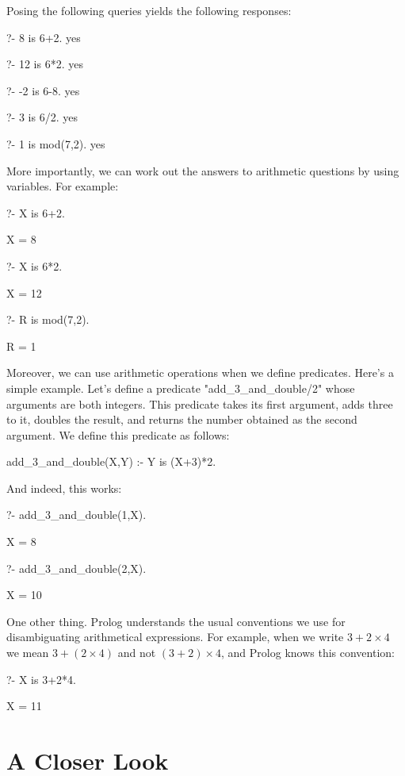 Posing the following queries yields the following responses:

\begin{LPNcodedisplay}
?- 8 is 6+2.
yes

?- 12 is 6*2.
yes

?- -2 is 6-8.
yes

?- 3 is 6/2.
yes

?- 1 is mod(7,2).
yes
\end{LPNcodedisplay}


More importantly, we can work out the answers to arithmetic questions
by using variables.  For example:

\begin{LPNcodedisplay}
?- X is 6+2.

X = 8

?- X is 6*2.

X = 12

?- R is mod(7,2).

R = 1
\end{LPNcodedisplay}

Moreover, we can use arithmetic operations when we define predicates.
Here's a simple example.  Let's define a predicate
"add_3_and_double/2" whose arguments are both integers.  This
predicate takes its first argument, adds three to it, doubles the
result, and returns the number obtained as the second argument.  We
define this predicate as follows:
\begin{LPNcodedisplay}
add_3_and_double(X,Y) :- Y is (X+3)*2.
\end{LPNcodedisplay}
And indeed, this works:
\begin{LPNcodedisplay}
?- add_3_and_double(1,X).

X = 8

?- add_3_and_double(2,X).

X = 10
\end{LPNcodedisplay}


One other thing.  Prolog understands the usual conventions we use for
disambiguating arithmetical expressions.  For example, when we write
$3+2\times 4$ we mean $3+(2\times 4)$ and not $(3+2)\times 4$, and
Prolog knows this convention:
\begin{LPNcodedisplay}
?- X is 3+2*4.

X = 11
\end{LPNcodedisplay}





\section{A Closer Look}\label{SEC.L5.LOOK}

